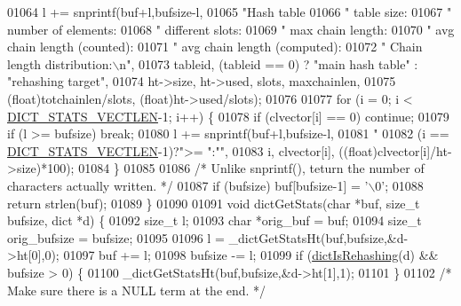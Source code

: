 \begin{DoxyCode}
01064     l += snprintf(buf+l,bufsize-l,
01065         \textcolor{stringliteral}{"Hash table %
01066         \textcolor{stringliteral}{" table size: %
01067         \textcolor{stringliteral}{" number of elements: %
01068         \textcolor{stringliteral}{" different slots: %
01069         \textcolor{stringliteral}{" max chain length: %
01070         \textcolor{stringliteral}{" avg chain length (counted): %
01071         \textcolor{stringliteral}{" avg chain length (computed): %
01072         \textcolor{stringliteral}{" Chain length distribution:\(\backslash\)n"},
01073         tableid, (tableid == 0) ? \textcolor{stringliteral}{"main hash table"} : \textcolor{stringliteral}{"rehashing target"},
01074         ht->size, ht->used, slots, maxchainlen,
01075         (\textcolor{keywordtype}{float})totchainlen/slots, (\textcolor{keywordtype}{float})ht->used/slots);
01076 
01077     \textcolor{keywordflow}{for} (i = 0; i < \hyperlink{dict_8c_a6c5f3134060f1ca17b2371b4271bbe64}{DICT\_STATS\_VECTLEN}-1; i++) \{
01078         \textcolor{keywordflow}{if} (clvector[i] == 0) \textcolor{keywordflow}{continue};
01079         \textcolor{keywordflow}{if} (l >= bufsize) \textcolor{keywordflow}{break};
01080         l += snprintf(buf+l,bufsize-l,
01081             \textcolor{stringliteral}{"   %
01082             (i == \hyperlink{dict_8c_a6c5f3134060f1ca17b2371b4271bbe64}{DICT\_STATS\_VECTLEN}-1)?\textcolor{stringliteral}{">= "}:\textcolor{stringliteral}{""},
01083             i, clvector[i], ((\textcolor{keywordtype}{float})clvector[i]/ht->size)*100);
01084     \}
01085 
01086     \textcolor{comment}{/* Unlike snprintf(), teturn the number of characters actually written. */}
01087     \textcolor{keywordflow}{if} (bufsize) buf[bufsize-1] = \textcolor{stringliteral}{'\(\backslash\)0'};
01088     \textcolor{keywordflow}{return} strlen(buf);
01089 \}
01090 
01091 \textcolor{keywordtype}{void} dictGetStats(\textcolor{keywordtype}{char} *buf, size\_t bufsize, dict *d) \{
01092     size\_t l;
01093     \textcolor{keywordtype}{char} *orig\_buf = buf;
01094     size\_t orig\_bufsize = bufsize;
01095 
01096     l = \_dictGetStatsHt(buf,bufsize,&d->ht[0],0);
01097     buf += l;
01098     bufsize -= l;
01099     \textcolor{keywordflow}{if} (\hyperlink{dict_8h_aa6e4917a6a32fdf47180e03ed8969e02}{dictIsRehashing}(d) && bufsize > 0) \{
01100         \_dictGetStatsHt(buf,bufsize,&d->ht[1],1);
01101     \}
01102     \textcolor{comment}{/* Make sure there is a NULL term at the end. */}
}}}}}}}}
\end{DoxyCode}
